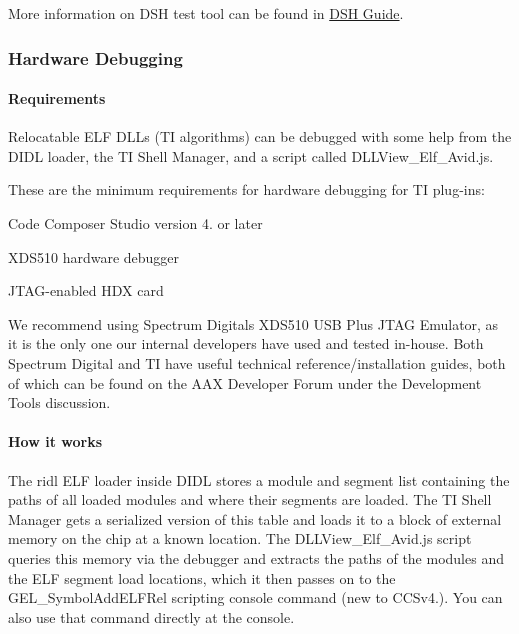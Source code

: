 More information on D\+S\+H test tool can be found in \hyperlink{a00365}{D\+S\+H Guide}.

\hypertarget{a00362_subsection__hardware_debugging}{}\subsubsection{Hardware Debugging}\label{a00362_subsection__hardware_debugging}
 \hypertarget{a00362_subsubsection__requirements_}{}\paragraph{Requirements}\label{a00362_subsubsection__requirements_}
 Relocatable E\+L\+F D\+L\+Ls (T\+I algorithms) can be debugged with some help from the D\+I\+D\+L loader, the T\+I Shell Manager, and a script called D\+L\+L\+View\+\_\+\+Elf\+\_\+\+Avid.\+js.

These are the minimum requirements for hardware debugging for T\+I plug-\/ins\+: 
\begin{DoxyItemize}
\item Code Composer Studio version 4. or later  
\item X\+D\+S510 hardware debugger  
\item J\+T\+A\+G-\/enabled H\+D\+X card  
\end{DoxyItemize}

We recommend using Spectrum Digital\textquotesingle{}s X\+D\+S510 U\+S\+B Plus J\+T\+A\+G Emulator, as it is the only one our internal developers have used and tested in-\/house. Both Spectrum Digital and T\+I have useful technical reference/installation guides, both of which can be found on the A\+A\+X Developer Forum under the \textquotesingle{}Development Tools\textquotesingle{} discussion.

\hypertarget{a00362_subsubsection__how_it_works_}{}\paragraph{How it works}\label{a00362_subsubsection__how_it_works_}
 The ridl E\+L\+F loader inside D\+I\+D\+L stores a module and segment list containing the paths of all loaded modules and where their segments are loaded. The T\+I Shell Manager gets a serialized version of this table and loads it to a block of external memory on the chip at a known location. The D\+L\+L\+View\+\_\+\+Elf\+\_\+\+Avid.\+js script queries this memory via the debugger and extracts the paths of the modules and the E\+L\+F segment load locations, which it then passes on to the {\ttfamily G\+E\+L\+\_\+\+Symbol\+Add\+E\+L\+F\+Rel} scripting console command (new to C\+C\+Sv4.). You can also use that command directly at the console.


